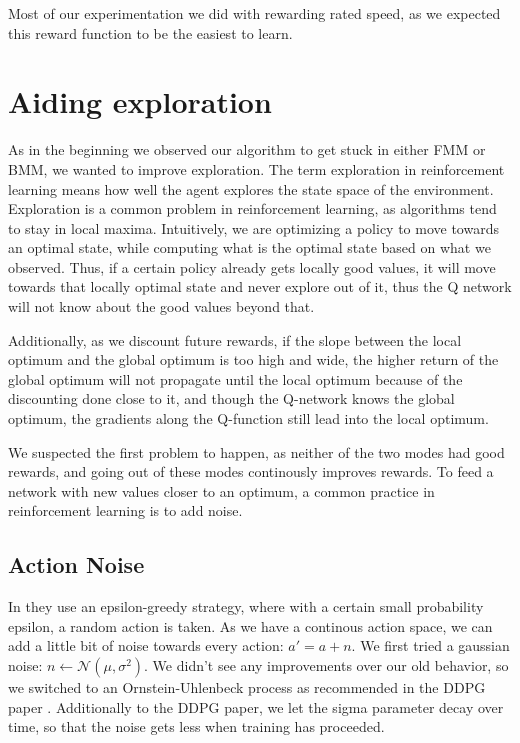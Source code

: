 \documentclass[hyperref,german,beleg]{cgvpub}
\begin{document}
Most of our experimentation we did with rewarding rated speed, as we expected this reward function to be the easiest to learn.

\section{Aiding exploration}

As in the beginning we observed our algorithm to get stuck in either \ac{FMM} or \ac{BMM}, we wanted to improve exploration. The term exploration in reinforcement learning means how well the agent explores the state space of the environment. Exploration is a common problem in reinforcement learning, as algorithms tend to stay in local maxima. Intuitively, we are optimizing a policy to move towards an optimal state, while computing what is the optimal state based on what we observed. Thus, if a certain policy already gets locally good values, it will move towards that locally optimal state and never explore out of it, thus the Q network will not know about the good values beyond that. 

Additionally, as we discount future rewards, if the slope between the local optimum and the global optimum is too high and wide, the higher return of the global optimum will not propagate until the local optimum because of the discounting done close to it, and though the Q-network knows the global optimum, the gradients along the Q-function still lead into the local optimum.

We suspected the first problem to happen, as neither of the two modes had good rewards, and going out of these modes continously improves rewards. To feed a network with new values closer to an optimum, a common practice in reinforcement learning is to add noise.

\subsection{Action Noise}

In \cite{mnihPlayingAtariDeep2013} they use an epsilon-greedy strategy, where with a certain small probability epsilon, a random action is taken. As we have a continous action space, we can add a little bit of noise towards every action: \(a' = a + n \). We first tried a gaussian noise: \(n \leftarrow \mathcal{N}(\mu, \sigma^2) \). We didn't see any improvements over our old behavior, so we switched to an Ornstein-Uhlenbeck process \cite{uhlenbeckTheoryBrownianMotion1930} as recommended in the \ac{DDPG} paper \cite[formula (7)]{lillicrapCONTINUOUSCONTROLDEEP2015}. Additionally to the \ac{DDPG} paper, we let the sigma parameter decay over time, so that the noise gets less when training has proceeded.
\end{document}
